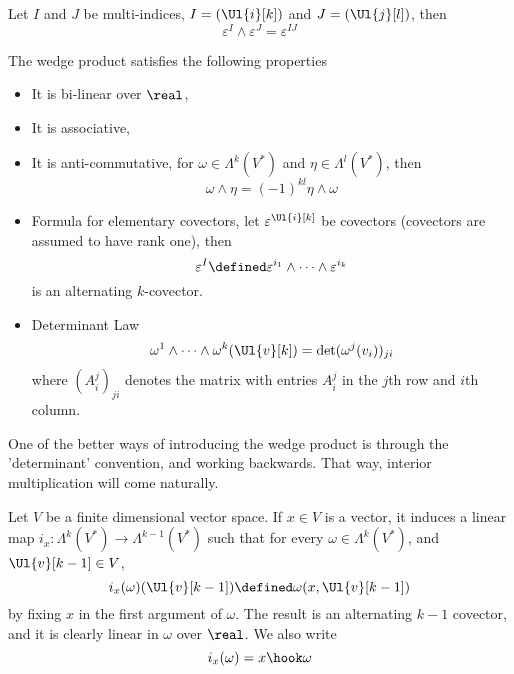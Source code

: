 \documentclass[../main-v2-manifolds.tex]{subfiles}
\begin{document}
\begin{wts}[Lemma 14.10]
    Let $I$ and $J$ be multi-indices, $I = (\Ul{i}[k])$ and $J = (\Ul{j}[l])$, then
    \begin{equation}
        \varepsilon^I\wedge\varepsilon^J = \varepsilon^{IJ}
    \end{equation}
\end{wts}

\begin{wts}\label{lee-chp14:lemma14.11}
    The wedge product satisfies the following properties
    \begin{itemize}
        \item It is bi-linear over $\real$,
        \item It is associative,
        \item It is anti-commutative, for $\omega\in\Lambda^k(V^*)$ and $\eta\in\Lambda^l(V^*)$, then
        \[
            \omega\wedge\eta = (-1)^{kl}\eta\wedge\omega
        \]
        \item Formula for elementary covectors, let $\varepsilon^{\Ul{i}[k]}$ be covectors (covectors are assumed to have rank one), then
        \[
        \varepsilon^I\defined \varepsilon^{i_1}\wedge\cdots\wedge \varepsilon^{i_k}
        \]
        is an alternating $k$-covector.
        \item Determinant Law
        \[
            \omega^1\wedge\cdots\wedge \omega^k(\Ul{v}[k]) = \det(\omega^j(v_i))_{ji}
        \]
        where $(A^j_i)_{ji}$ denotes the matrix with entries $A^j_i$ in the $j$th row and $i$th column.
    \end{itemize}
\end{wts}

One of the better ways of introducing the wedge product is through the 'determinant' convention, and working backwards. That way, interior multiplication will come naturally.

\begin{definition}
    Let $V$ be a finite dimensional vector space.  If $x\in V$ is a vector, it induces a linear map $i_x: \Lambda^k(V^*)\to \Lambda^{k-1}(V^*)$ such that for every $\omega\in \Lambda^k(V^*)$, and $\Ul{v}[k-1]\in V$, 
    \[
        i_x(\omega)(\Ul{v}[k-1]) \defined \omega(x,\Ul{v}[k-1])
    \]
    by fixing $x$ in the first argument of $\omega$. The result is an alternating $k-1$ covector, and it is clearly linear in $\omega$ over $\real$. We also write
    \[
        i_x(\omega) = x\hook \omega
    \]
\end{definition}
\end{document}
